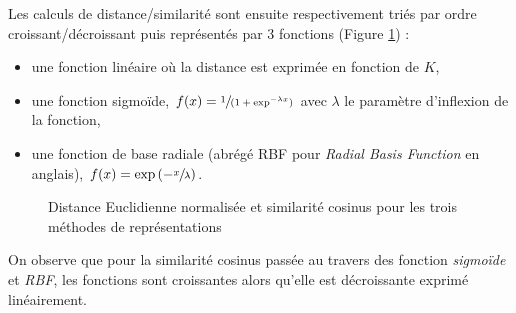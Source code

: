 Les calculs de distance/similarité sont ensuite respectivement triés par ordre croissant/décroissant puis représentés par 3 fonctions (Figure \ref{fig:resume_dist_simil}) : 

\begin{itemize}
\item une fonction linéaire où la distance est exprimée en fonction de $K$, 
\item une fonction sigmoïde, $f(x) = \sfrac{1}{(1+\exp^{-\lambda x})}$ avec $\lambda$ le paramètre d'inflexion de la fonction, 
\item une fonction de base radiale (abrégé RBF pour \textit{Radial Basis Function} en anglais), $f(x) = \exp\left(-\sfrac{x}{\lambda} \right)$.\\
\end{itemize}

\begin{figure}
    \centering
    \hfill
    \caption{Distance Euclidienne normalisée  et similarité cosinus  pour les trois méthodes de représentations}
    \label{fig:resume_dist_simil}
\end{figure}

On observe que pour la similarité cosinus passée au travers des fonction \textit{sigmoïde} et \textit{RBF}, les fonctions sont croissantes alors qu'elle est décroissante exprimé linéairement.

